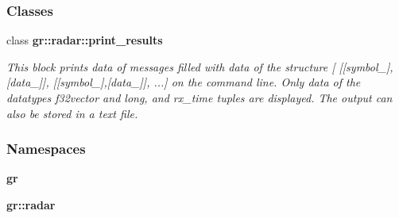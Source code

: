 \subsubsection*{Classes}
\begin{DoxyCompactItemize}
\item 
class {\bf gr\+::radar\+::print\+\_\+results}
\begin{DoxyCompactList}\small\item\em This block prints data of messages filled with data of the structure [ [[symbol\+\_],[data\+\_]], [[symbol\+\_],[data\+\_]], ...] on the command line. Only data of the datatypes f32vector and long, and rx\+\_\+time tuples are displayed. The output can also be stored in a text file. \end{DoxyCompactList}\end{DoxyCompactItemize}
\subsubsection*{Namespaces}
\begin{DoxyCompactItemize}
\item 
 {\bf gr}
\item 
 {\bf gr\+::radar}
\end{DoxyCompactItemize}
